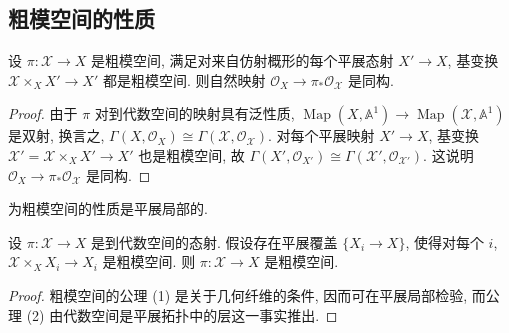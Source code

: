 \subsection{粗模空间的性质}\label{src:5.2.3-subsection}
\begin{lemma}\label{src:5.2.9}
设 $\pi:\mathcal X\to X$ 是粗模空间, 满足对来自仿射概形的每个平展态射 $X'\to X$, 基变换 $\mathcal X\times_X X'\to X'$ 都是粗模空间. 则自然映射 $\mathcal O_X\to\pi_*\mathcal O_{\mathcal X}$ 是同构.
\end{lemma}
\begin{proof}
由于 $\pi$ 对到代数空间的映射具有泛性质, $\operatorname{Map}(X,\mathbb A^1)\to\operatorname{Map}(\mathcal X,\mathbb A^1)$ 是双射, 换言之, $\Gamma(X,\mathcal O_X)\cong\Gamma(\mathcal X,\mathcal O_{\mathcal X})$. 对每个平展映射 $X'\to X$, 基变换 $\mathcal X'=\mathcal X\times_X X'\to X'$ 也是粗模空间, 故 $\Gamma(X',\mathcal O_{X'})\cong\Gamma(\mathcal X',\mathcal O_{\mathcal X'})$. 这说明 $\mathcal O_X\to\pi_*\mathcal O_{\mathcal X}$ 是同构.
\end{proof}
为粗模空间的性质是平展局部的.
\begin{lemma}\label{src:5.2.10}
设 $\pi:\mathcal X\to X$ 是到代数空间的态射. 假设存在平展覆盖 $\{X_i\to X\}$, 使得对每个 $i$, $\mathcal X\times_X X_i\to X_i$ 是粗模空间. 则 $\pi:\mathcal X\to X$ 是粗模空间.
\end{lemma}
\begin{proof}
粗模空间的公理 (1) 是关于几何纤维的条件, 因而可在平展局部检验, 而公理 (2) 由代数空间是平展拓扑中的层这一事实推出.
\end{proof}

